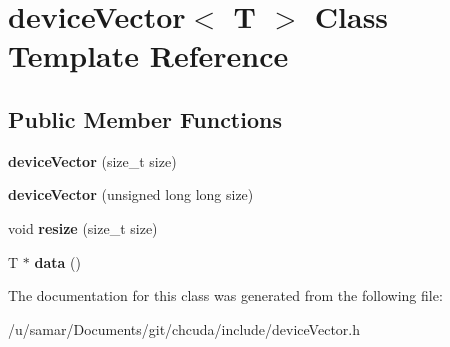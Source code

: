 \hypertarget{classdeviceVector}{}\section{device\+Vector$<$ T $>$ Class Template Reference}
\label{classdeviceVector}
\subsection*{Public Member Functions}
\begin{DoxyCompactItemize}
\item 
\hypertarget{classdeviceVector_ac86c65e15ed22b7af8e5463cbee79eb6}{}\label{classdeviceVector_ac86c65e15ed22b7af8e5463cbee79eb6} 
{\bfseries device\+Vector} (size\+\_\+t size)
\item 
\hypertarget{classdeviceVector_a1a71678e2d829141c607cdd651c1c3f2}{}\label{classdeviceVector_a1a71678e2d829141c607cdd651c1c3f2} 
{\bfseries device\+Vector} (unsigned long long size)
\item 
\hypertarget{classdeviceVector_aa91a100e930ce5c2e49479bc688ce123}{}\label{classdeviceVector_aa91a100e930ce5c2e49479bc688ce123} 
void {\bfseries resize} (size\+\_\+t size)
\item 
\hypertarget{classdeviceVector_a1399a6e38bfd7b81560aedeab3335816}{}\label{classdeviceVector_a1399a6e38bfd7b81560aedeab3335816} 
T $\ast$ {\bfseries data} ()
\end{DoxyCompactItemize}


The documentation for this class was generated from the following file\+:\begin{DoxyCompactItemize}
\item 
/u/samar/\+Documents/git/chcuda/include/device\+Vector.\+h\end{DoxyCompactItemize}
